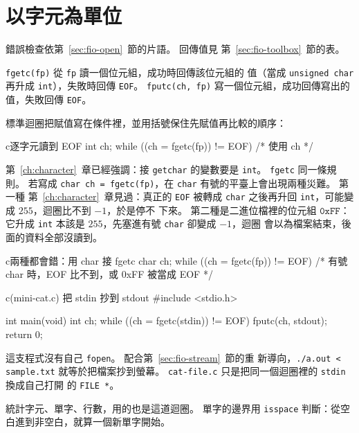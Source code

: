 \section{以字元為單位}
\label{sec:fio-char}

錯誤檢查依第~\ref{sec:fio-open}~節的片語。 回傳值見
第~\ref{sec:fio-toolbox}~節的表。

\texttt{fgetc(fp)} 從 \texttt{fp} 讀一個位元組，成功時回傳該位元組的
值（當成 \texttt{unsigned char} 再升成 \texttt{int}），失敗時回傳
\texttt{EOF}。 \texttt{fputc(ch, fp)} 寫一個位元組，成功回傳寫出的
值，失敗回傳 \texttt{EOF}。

標準迴圈把賦值寫在條件裡，並用括號保住先賦值再比較的順序：

\begin{code}{c}{逐字元讀到 EOF}
int ch;
while ((ch = fgetc(fp)) != EOF) {
    /* 使用 ch */
}
\end{code}

第~\ref{ch:character}~章已經強調：接 \texttt{getchar} 的變數要是
\texttt{int}。 \texttt{fgetc} 同一條規則。 若寫成 \texttt{char ch =
fgetc(fp)}，在 \texttt{char} 有號的平臺上會出現兩種災難。 第一種
第~\ref{ch:character}~章見過：真正的 \texttt{EOF} 被轉成 \texttt{char}
之後再升回 \texttt{int}，可能變成 $255$，迴圈比不到 $-1$，於是停不
下來。 第二種是二進位檔裡的位元組 $\mathtt{0xFF}$：它升成
\texttt{int} 本該是 $255$，先塞進有號 \texttt{char} 卻變成 $-1$，迴圈
會以為檔案結束，後面的資料全部沒讀到。

\begin{code}{c}{兩種都會錯：用 char 接 fgetc}
char ch;
while ((ch = fgetc(fp)) != EOF) {
    /* 有號 char 時，EOF 比不到，或 0xFF 被當成 EOF */
}
\end{code}

\begin{example}[label=ex:fio-mini-cat]{c}{(mini-cat.c) 把 stdin 抄到 stdout}
#include <stdio.h>

int main(void) {
    int ch;
    while ((ch = fgetc(stdin)) != EOF) {
        fputc(ch, stdout);
    }
    return 0;
}
\end{example}


這支程式沒有自己 \texttt{fopen}。 配合第~\ref{sec:fio-stream}~節的重
新導向，\texttt{./a.out < sample.txt} 就等於把檔案抄到螢幕。
\texttt{cat-file.c} 只是把同一個迴圈裡的 \texttt{stdin} 換成自己打開
的 \texttt{FILE *}。

統計字元、單字、行數，用的也是這道迴圈。 單字的邊界用
\texttt{isspace} 判斷：從空白進到非空白，就算一個新單字開始。

